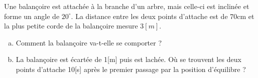 %
%
    Une balançoire est attachée à la branche d'un arbre, mais celle-ci est inclinée et forme un angle de \(20^{\circ}\). La distance entre les deux points d'attache est de 70cm et la plus petite corde de la balançoire mesure \(3[m]\).
    \begin{enumerate}[a)]
        \item Comment la balançoire va-t-elle se comporter ?
        \item La balançoire est écartée de 1[m] puis est lachée. Où se trouvent les deux points d'attache 10[s] après le premier passage par la position d'équilibre ?
    \end{enumerate}
